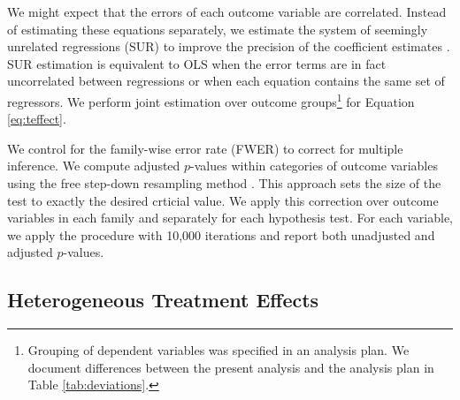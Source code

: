 \documentclass[12pt]{article}
\begin{document}
		We might expect that the errors of each outcome variable are correlated. Instead of estimating these equations separately, we estimate the system of seemingly unrelated regressions (SUR) to improve the precision of the coefficient estimates \parencite{zellner_efficient_1962}. SUR estimation is equivalent to OLS when the error terms are in fact uncorrelated between regressions or when each equation contains the same set of regressors. We perform joint estimation over outcome groups\footnote{Grouping of dependent variables was specified in an analysis plan. We document differences between the present analysis and the analysis plan in Table \ref{tab:deviations}.} for Equation \ref{eq:teffect}.

		We control for the family-wise error rate (FWER) to correct for multiple inference. We compute adjusted $p$-values within categories of outcome variables using the free step-down resampling method \parencite{westfall_resampling-based_1993,anderson_multiple_2008}. This approach sets the size of the test to exactly the desired crticial value. We apply this correction over outcome variables in each family and separately for each hypothesis test. For each variable, we apply the procedure with 10,000 iterations and report both unadjusted and adjusted $p$-values.





	\subsection{Heterogeneous Treatment Effects}
\end{document}
